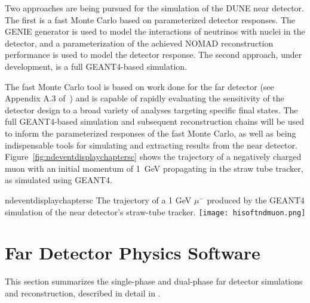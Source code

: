 Two approaches are being  pursued for the simulation of
the DUNE near detector.  The first is a fast Monte Carlo based on
parameterized detector responses. The GENIE\cite{GENIE} generator is
used to model the interactions of neutrinos with nuclei in the
detector, and a parameterization of the achieved NOMAD reconstruction
performance is used to model the detector response.  
The second
approach, under development, is a full GEANT4-based simulation. 
 
 The fast Monte Carlo tool is based on work done for the
far detector (see Appendix A.3 of~\cite{Adams:2013qkq}) and is capable of
rapidly evaluating the sensitivity of the detector design to a broad
variety of analyses targeting specific final states.  The full
GEANT4-based simulation and subsequent reconstruction chains will be
used to inform the parameterized responses of the fast Monte Carlo, as
well as being indispensable tools for simulating and extracting
results from the near detector.
Figure~\ref{fig:ndeventdisplaychaptersc} shows the trajectory of a
negatively charged muon with an initial momentum of 1~GeV propagating
in the straw tube tracker, as simulated using GEANT4.
\begin{cdrfigure}{ndeventdisplaychaptersc}
{The trajectory of a 1 GeV $\mu^-$ produced by the GEANT4 simulation of the near detector's straw-tube tracker.}
\texttt{[image: hisoftndmuon.png]}
\end{cdrfigure}

\section{Far Detector Physics Software}
\label{sec:detectors-sc-physics-software}

This section summarizes %
the single-phase and dual-phase far detector
simulations and reconstruction, described in detail in \anxreco. %

%


